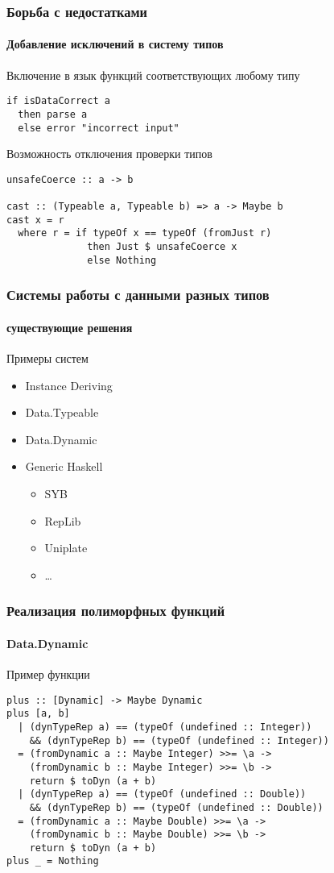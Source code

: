 \documentclass[ucs]{beamer}
\begin{document}

\begin{frame}[fragile]
  \frametitle{Борьба с недостатками}
  \framesubtitle{Добавление исключений в систему типов}

  \begin{block}{Включение в язык функций соответствующих любому типу}
\begin{verbatim}
if isDataCorrect a
  then parse a
  else error "incorrect input"
\end{verbatim}
  \end{block}

  \begin{block}{Возможность отключения проверки типов}
\begin{verbatim}
unsafeCoerce :: a -> b

cast :: (Typeable a, Typeable b) => a -> Maybe b
cast x = r
  where r = if typeOf x == typeOf (fromJust r)
              then Just $ unsafeCoerce x
              else Nothing
\end{verbatim}
  \end{block}
\end{frame}

\begin{frame}[fragile]
  \frametitle{Системы работы с данными разных типов}
  \framesubtitle{существующие решения}

  \begin{block}{Примеры систем}
    \begin{itemize}
    \item Instance Deriving
    \item Data.Typeable
    \item Data.Dynamic
    \item Generic Haskell
      \begin{itemize}
      \item SYB
      \item RepLib
      \item Uniplate
      \item \dots
      \end{itemize}
    \end{itemize}
  \end{block}
\end{frame}

\begin{frame}[fragile]
  \frametitle{Реализация полиморфных функций}
  \framesubtitle{Data.Dynamic}

  \begin{block}{Пример функции}
\begin{verbatim}
plus :: [Dynamic] -> Maybe Dynamic
plus [a, b]
  | (dynTypeRep a) == (typeOf (undefined :: Integer))
    && (dynTypeRep b) == (typeOf (undefined :: Integer))
  = (fromDynamic a :: Maybe Integer) >>= \a ->
    (fromDynamic b :: Maybe Integer) >>= \b ->
    return $ toDyn (a + b)
  | (dynTypeRep a) == (typeOf (undefined :: Double))
    && (dynTypeRep b) == (typeOf (undefined :: Double))
  = (fromDynamic a :: Maybe Double) >>= \a ->
    (fromDynamic b :: Maybe Double) >>= \b ->
    return $ toDyn (a + b)
plus _ = Nothing
\end{verbatim}
  \end{block}
\end{frame}
\end{document}
